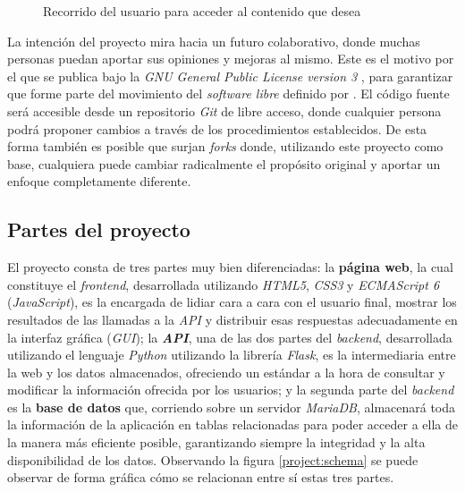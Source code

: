 \documentclass[12pt,a4paper,titlepage]{article}
\begin{document}
    \begin{figure}[ht]
        \centering
        \caption{Recorrido del usuario para acceder al contenido que desea}\bigskip
        \label{web:schema}
        \shorthandoff{>}\shorthandoff{<}
        \shorthandon{>}\shorthandon{<}
    \end{figure}

    La intención del proyecto mira hacia un futuro colaborativo, donde muchas personas puedan aportar sus opiniones y mejoras al mismo. Este es el motivo por el que se publica bajo la \emph{GNU General Public License version 3} \cite{gnugplv3}, para garantizar que forme parte del movimiento del \emph{software libre} definido por \textcite{libresoftwaredefinition}. El código fuente será accesible desde un repositorio \emph{Git} de libre acceso, donde cualquier persona podrá proponer cambios a través de los procedimientos establecidos. De esta forma también es posible que surjan \textit{forks} \cite{wiki:fork} donde, utilizando este proyecto como base, cualquiera puede cambiar radicalmente el propósito original y aportar un enfoque completamente diferente.

    \subsection{Partes del proyecto}

    El proyecto consta de tres partes muy bien diferenciadas: la \textbf{página web}, la cual constituye el \textit{frontend}, desarrollada utilizando \emph{HTML5}, \emph{CSS3} y \emph{ECMAScript 6} (\emph{JavaScript}), es la encargada de lidiar cara a cara con el usuario final, mostrar los resultados de las llamadas a la \emph{API} y distribuir esas respuestas adecuadamente en la interfaz gráfica (\emph{GUI}); la \emph{\textbf{API}}, una de las dos partes del \textit{backend}, desarrollada utilizando el lenguaje \emph{Python} utilizando la librería \textit{Flask}, es la intermediaria entre la web y los datos almacenados, ofreciendo un estándar a la hora de consultar y modificar la información ofrecida por los usuarios; y la segunda parte del \textit{backend} es la \textbf{base de datos} que, corriendo sobre un servidor \emph{MariaDB}, almacenará toda la información de la aplicación en tablas relacionadas para poder acceder a ella de la manera más eficiente posible, garantizando siempre la integridad y la alta disponibilidad de los datos. Observando la figura \ref{project:schema} se puede observar de forma gráfica cómo se relacionan entre sí estas tres partes.
\end{document}
